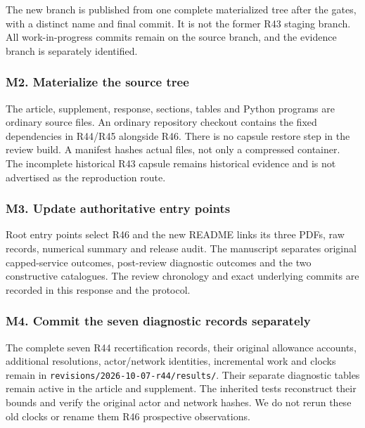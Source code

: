\documentclass[ecta,nameyear,draft]{econsocart}
\begin{document}
The new branch is published from one complete materialized tree after
the gates, with a distinct name and final commit. It is not the former
R43 staging branch. All work-in-progress commits remain on the source
branch, and the evidence branch is separately identified.

\hypertarget{m2-materialize-the-source-tree}{%
\subsubsection{M2. Materialize the source
tree}\label{m2-materialize-the-source-tree}}

The article, supplement, response, sections, tables and Python programs
are ordinary source files. An ordinary repository checkout contains the
fixed dependencies in R44/R45 alongside R46. There is no capsule restore
step in the review build. A manifest hashes actual files, not only a
compressed container. The incomplete historical R43 capsule remains
historical evidence and is not advertised as the reproduction route.

\hypertarget{m3-update-authoritative-entry-points}{%
\subsubsection{M3. Update authoritative entry
points}\label{m3-update-authoritative-entry-points}}

Root entry points select R46 and the new README links its three PDFs,
raw records, numerical summary and release audit. The manuscript
separates original capped-service outcomes, post-review diagnostic
outcomes and the two constructive catalogues. The review chronology and
exact underlying commits are recorded in this response and the protocol.

\hypertarget{m4-commit-the-seven-diagnostic-records-separately}{%
\subsubsection{M4. Commit the seven diagnostic records
separately}\label{m4-commit-the-seven-diagnostic-records-separately}}

The complete seven R44 recertification records, their original allowance
accounts, additional resolutions, actor/network identities, incremental
work and clocks remain in \nolinkurl{revisions/2026-10-07-r44/results/}.
Their separate diagnostic tables remain active in the article and
supplement. The inherited tests reconstruct their bounds and verify the
original actor and network hashes. We do not rerun these old clocks or
rename them R46 prospective observations.
\end{document}
